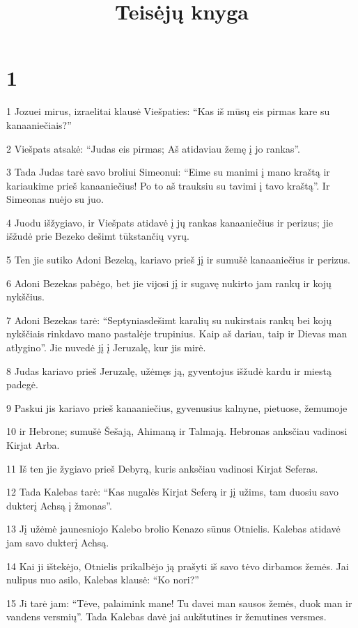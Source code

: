 

\title{Teisėjų knyga}

\chapter{1}

\par 1 Jozuei mirus, izraelitai klausė Viešpaties: “Kas iš mūsų eis pirmas kare su kanaaniečiais?” 
\par 2 Viešpats atsakė: “Judas eis pirmas; Aš atidaviau žemę į jo rankas”. 
\par 3 Tada Judas tarė savo broliui Simeonui: “Eime su manimi į mano kraštą ir kariaukime prieš kanaaniečius! Po to aš trauksiu su tavimi į tavo kraštą”. Ir Simeonas nuėjo su juo. 
\par 4 Juodu išžygiavo, ir Viešpats atidavė į jų rankas kanaaniečius ir perizus; jie išžudė prie Bezeko dešimt tūkstančių vyrų. 
\par 5 Ten jie sutiko Adoni Bezeką, kariavo prieš jį ir sumušė kanaaniečius ir perizus. 
\par 6 Adoni Bezekas pabėgo, bet jie vijosi jį ir sugavę nukirto jam rankų ir kojų nykščius. 
\par 7 Adoni Bezekas tarė: “Septyniasdešimt karalių su nukirstais rankų bei kojų nykščiais rinkdavo mano pastalėje trupinius. Kaip aš dariau, taip ir Dievas man atlygino”. Jie nuvedė jį į Jeruzalę, kur jis mirė. 
\par 8 Judas kariavo prieš Jeruzalę, užėmęs ją, gyventojus išžudė kardu ir miestą padegė. 
\par 9 Paskui jis kariavo prieš kanaaniečius, gyvenusius kalnyne, pietuose, žemumoje 
\par 10 ir Hebrone; sumušė Šešają, Ahimaną ir Talmają. Hebronas anksčiau vadinosi Kirjat Arba. 
\par 11 Iš ten jie žygiavo prieš Debyrą, kuris anksčiau vadinosi Kirjat Seferas. 
\par 12 Tada Kalebas tarė: “Kas nugalės Kirjat Seferą ir jį užims, tam duosiu savo dukterį Achsą į žmonas”. 
\par 13 Jį užėmė jaunesniojo Kalebo brolio Kenazo sūnus Otnielis. Kalebas atidavė jam savo dukterį Achsą. 
\par 14 Kai ji ištekėjo, Otnielis prikalbėjo ją prašyti iš savo tėvo dirbamos žemės. Jai nulipus nuo asilo, Kalebas klausė: “Ko nori?” 
\par 15 Ji tarė jam: “Tėve, palaimink mane! Tu davei man sausos žemės, duok man ir vandens versmių”. Tada Kalebas davė jai aukštutines ir žemutines versmes. 
